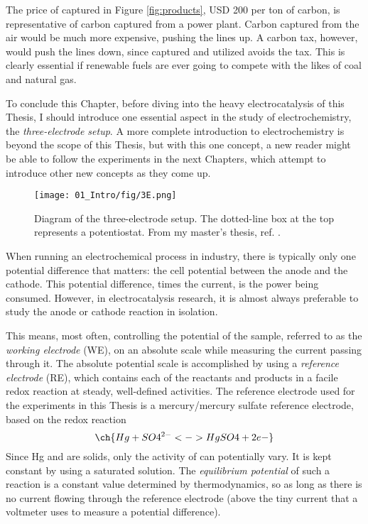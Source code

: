 The price of captured  in Figure \ref{fig:products}, USD 200 per ton of carbon, is representative of carbon captured from a power plant\cite{Majumdar2016}. Carbon captured from the air would be much more expensive, pushing the lines up. A carbon tax, however, would push the lines down, since captured and utilized  avoids the tax. This is clearly essential if renewable fuels are ever going to compete with the likes of coal and natural gas.


\vspace{5mm}
To conclude this Chapter, before diving into the heavy electrocatalysis of this Thesis, I should introduce one essential aspect in the study of electrochemistry, the \textit{three-electrode setup}. A more complete introduction to electrochemistry\cite{Bard2001, Scott2016_MSc} is beyond the scope of this Thesis, but with this one concept, a new reader might be able to follow the experiments in the next Chapters, which attempt to introduce other new concepts as they come up.

\begin{figure}[b!]
	\centering
	\texttt{[image: 01\_Intro/fig/3E.png]}
	\caption{Diagram of the three-electrode setup. The dotted-line box at the top represents a potentiostat. From my master's thesis, ref. .}
	\label{fig:3E}
\end{figure}

When running an electrochemical process in industry, there is typically only one potential difference that matters: the cell potential between the anode and the cathode. This potential difference, times the current, is the power being consumed. However, in electrocatalysis research, it is almost always preferable to study the anode or cathode reaction in isolation. 

This means, most often, controlling the potential of the sample, referred to as the \textit{working electrode} (WE), on an absolute scale while measuring the current passing through it. The absolute potential scale is accomplished by using a \textit{reference electrode} (RE), which contains each of the reactants and products in a facile redox reaction at steady, well-defined activities. The reference electrode used for the experiments in this Thesis is a mercury/mercury sulfate reference electrode, based on the redox reaction
\begin{equation}
\ch{Hg + SO4^{2-} <-> HgSO4 + 2 e-}
\end{equation}
Since Hg and  are solids, only the activity of  can potentially vary. It is kept constant by using a saturated  solution. The \textit{equilibrium potential} of such a reaction is a constant value determined by thermodynamics, so as long as there is no current flowing through the reference electrode (above the tiny current that a voltmeter uses to measure a potential difference).

